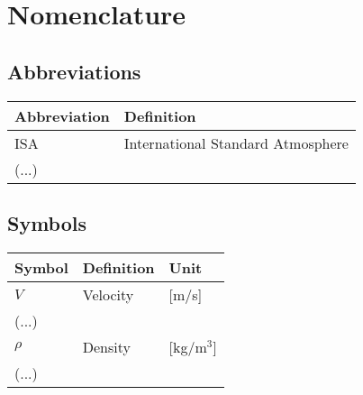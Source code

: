 \chapter*{Nomenclature}

\section*{Abbreviations}

\begin{longtable}{p{2.5cm}p{7cm}}
    \toprule
    Abbreviation & Definition \\
    \midrule\endhead %
    ISA & International Standard Atmosphere \\
    (...) \\
    \bottomrule
\end{longtable}

\section*{Symbols}

\begin{longtable}{p{2.5cm}p{8cm}p{2.5cm}}
    \toprule
    Symbol & Definition & Unit \\
    \midrule\endhead %
    $V$ & Velocity & [m/s] \\
    (...) \\
    \midrule %
    $\rho$ & Density & [kg/m$^3$] \\
    (...) \\
    \bottomrule
\end{longtable}
